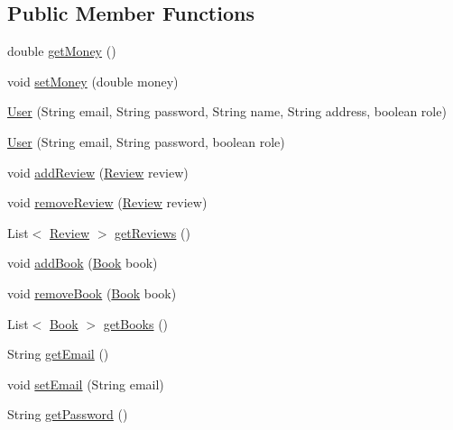 \subsection*{Public Member Functions}
\begin{DoxyCompactItemize}
\item 
double \hyperlink{classserver_1_1data_1_1_user_a58dcf7faa81b886e169c3b0f074db3d8}{get\+Money} ()
\item 
void \hyperlink{classserver_1_1data_1_1_user_a5448e1a49de3b0057c9bd57b7dcfe888}{set\+Money} (double money)
\item 
\hyperlink{classserver_1_1data_1_1_user_a7167eb7271a1481528efbb6d8f825c76}{User} (String email, String password, String name, String address, boolean role)
\item 
\hyperlink{classserver_1_1data_1_1_user_a43eb15725c3b2bfe218153a48bfbd610}{User} (String email, String password, boolean role)
\item 
void \hyperlink{classserver_1_1data_1_1_user_a5baca76a3ea6ee21979a70c89581fb43}{add\+Review} (\hyperlink{classserver_1_1data_1_1_review}{Review} review)
\item 
void \hyperlink{classserver_1_1data_1_1_user_accc20703f8edd6050d7af19df757925d}{remove\+Review} (\hyperlink{classserver_1_1data_1_1_review}{Review} review)
\item 
List$<$ \hyperlink{classserver_1_1data_1_1_review}{Review} $>$ \hyperlink{classserver_1_1data_1_1_user_aeb59521ec4dddcd7cc91a44ae01e660f}{get\+Reviews} ()
\item 
void \hyperlink{classserver_1_1data_1_1_user_a58385578ceb7c70fc9e8b0d1b2aa2e08}{add\+Book} (\hyperlink{classserver_1_1data_1_1_book}{Book} book)
\item 
void \hyperlink{classserver_1_1data_1_1_user_ab3f96361a26a5281096e526f81f95d7a}{remove\+Book} (\hyperlink{classserver_1_1data_1_1_book}{Book} book)
\item 
List$<$ \hyperlink{classserver_1_1data_1_1_book}{Book} $>$ \hyperlink{classserver_1_1data_1_1_user_aba14990be3bc450a71725f2de9d0eaf0}{get\+Books} ()
\item 
String \hyperlink{classserver_1_1data_1_1_user_ac3981c712bb429f87e43321c10d3858d}{get\+Email} ()
\item 
void \hyperlink{classserver_1_1data_1_1_user_ace8890c975b2543bbbf4d19b4e64d367}{set\+Email} (String email)
\item 
String \hyperlink{classserver_1_1data_1_1_user_af36fc893e682a1b8f79f1e092e7f8057}{get\+Password} ()
\item 

\end{DoxyCompactItemize}
